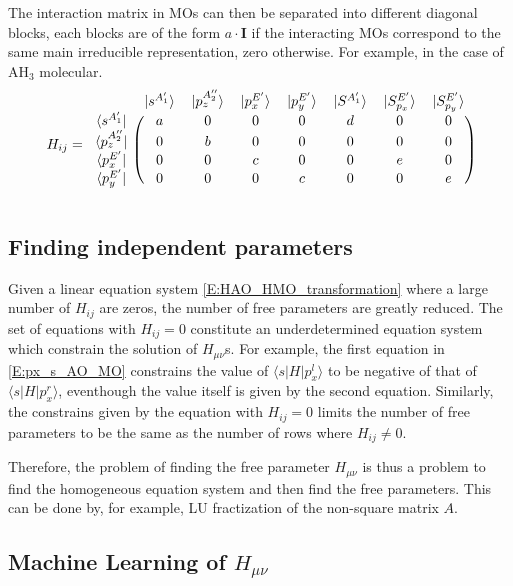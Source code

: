 \documentclass{article}
\begin{document}
The interaction matrix in MOs can then be separated into different diagonal blocks, each blocks are of the form $a\cdot \mathbf{I}$ if 
the interacting MOs correspond to the same main irreducible representation, zero otherwise.
For example, in the case of AH$_3$ molecular.
\begin{equation}
    H_{ij} = \begin{blockarray}{cccccccc}
        & |s^{A_1'}\rangle & |p_z^{A_2''}\rangle & |p_x^{E'}\rangle & |p_y^{E'}\rangle 
        & |S^{A_1'}\rangle & |S^{E'}_{p_x}\rangle & |S^{E'}_{p_y}\rangle \\
        \begin{block}{c(ccccccc)}
        \langle s^{A_1'}    |  & a & 0 & 0 & 0 & d & 0 & 0 \\
        \langle p_z^{A_2''} |  & 0 & b & 0 & 0 & 0 & 0 & 0 \\
        \langle p_x^{E'}    |  & 0 & 0 & c & 0 & 0 & e & 0 \\
        \langle p_y^{E'}    |  & 0 & 0 & 0 & c & 0 & 0 & e \\
        \end{block}
        \end{blockarray}
\end{equation}

\subsection{Finding independent parameters}
Given a linear equation system \eqref{E:HAO_HMO_transformation} where a large number of $H_{ij}$ are zeros,
the number of free parameters are greatly reduced. The set of equations with $H_{ij} = 0$ constitute an 
underdetermined equation system which constrain the solution of $H_{\mu\nu}$s. For example, the first 
equation in \eqref{E:px_s_AO_MO} constrains the value of $\langle s | H | p_x^l \rangle$ to be negative of 
that of $\langle s | H | p_x^r \rangle$, eventhough the value itself is given by the second equation. 
Similarly, the constrains given by the equation with $H_{ij} = 0$ limits the number of free parameters 
to be the same as the number of rows where $H_{ij} \neq 0$. 

Therefore, the problem of finding the free parameter $H_{\mu\nu}$ is thus a problem to find the homogeneous 
equation system and then find the free parameters. This can be done by, for example, LU fractization of the 
non-square matrix $A$.

\subsection{Machine Learning of $H_{\mu\nu}$}
 
\end{document}
